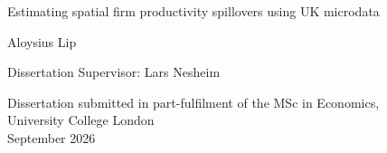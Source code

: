 \begin{titlepage}
\vspace*{10cm}
\begin{center}
    Estimating spatial firm productivity spillovers using UK microdata
\end{center}
\vspace{2.5cm}
\begin{center}
    Aloysius Lip
\end{center}
\vspace{2.5cm}
\begin{center}
    Dissertation Supervisor: Lars Nesheim
\end{center}
\vspace{2cm}
\begin{center}
    Dissertation submitted in part-fulfilment of the MSc in Economics,\\[0.6em]
    University College London\\[0.6em]
    September 2026
\end{center}
\end{titlepage}
